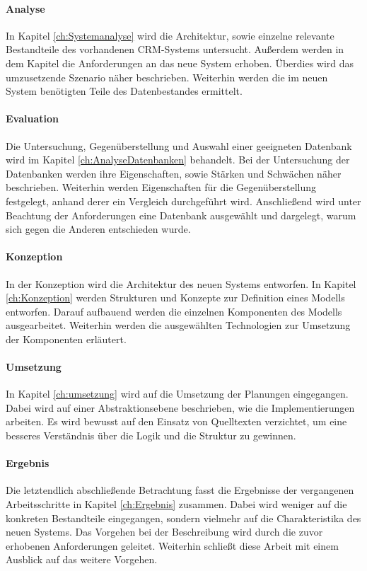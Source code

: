 \paragraph{Analyse} In Kapitel \ref{ch:Systemanalyse} wird die Architektur, sowie einzelne relevante Bestandteile des vorhandenen CRM-Systems untersucht. Außerdem werden in dem Kapitel die Anforderungen an das neue System erhoben. Überdies wird das umzusetzende Szenario näher beschrieben. Weiterhin werden die im neuen System benötigten Teile des Datenbestandes ermittelt. 

\paragraph{Evaluation} Die Untersuchung, Gegenüberstellung und Auswahl einer geeigneten Datenbank wird im Kapitel \ref{ch:AnalyseDatenbanken} behandelt. Bei der Untersuchung der Datenbanken werden ihre Eigenschaften, sowie Stärken und Schwächen näher beschrieben. Weiterhin werden Eigenschaften für die Gegenüberstellung festgelegt, anhand derer ein Vergleich durchgeführt wird. Anschließend wird unter Beachtung der Anforderungen eine Datenbank ausgewählt und dargelegt, warum sich gegen die Anderen entschieden wurde.  

\paragraph{Konzeption} In der Konzeption wird die Architektur des neuen Systems entworfen. In Kapitel \ref{ch:Konzeption} werden Strukturen und Konzepte zur Definition eines Modells entworfen. Darauf aufbauend werden die einzelnen Komponenten des Modells ausgearbeitet. Weiterhin werden die ausgewählten Technologien zur Umsetzung der Komponenten erläutert. 

\paragraph{Umsetzung} In Kapitel \ref{ch:umsetzung} wird auf die Umsetzung der Planungen eingegangen. Dabei wird auf einer Abstraktionsebene beschrieben, wie die Implementierungen arbeiten. Es wird bewusst auf den Einsatz von Quelltexten verzichtet, um eine besseres Verständnis über die Logik und die Struktur zu gewinnen. 

\paragraph{Ergebnis} Die letztendlich abschließende Betrachtung fasst die Ergebnisse der vergangenen Arbeitsschritte in Kapitel \ref{ch:Ergebnis} zusammen. Dabei wird weniger auf die konkreten Bestandteile eingegangen, sondern vielmehr auf die Charakteristika des neuen Systems. Das Vorgehen bei der Beschreibung wird durch die zuvor erhobenen Anforderungen geleitet. Weiterhin schließt diese Arbeit mit einem Ausblick auf das weitere Vorgehen. 


